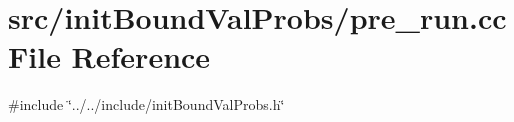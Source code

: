 \section{src/init\+Bound\+Val\+Probs/pre\+\_\+run.cc File Reference}
\label{pre__run_8cc}
{\ttfamily \#include \char`\"{}../../include/init\+Bound\+Val\+Probs.\+h\char`\"{}}\newline
